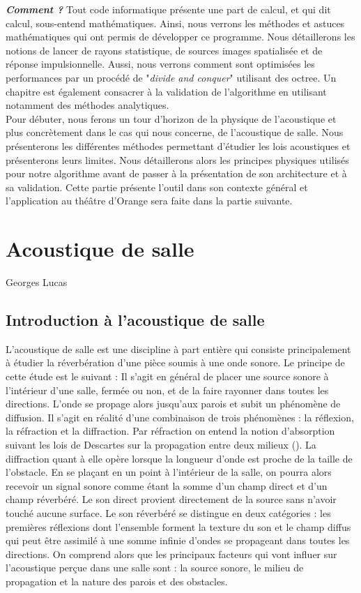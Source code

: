 \textit{\textbf{Comment ?}} Tout code informatique présente une part de calcul, et qui dit calcul, sous-entend mathématiques. Ainsi, nous verrons les méthodes et astuces mathématiques qui ont permis de développer ce programme. Nous détaillerons les notions de lancer de rayons statistique, de sources images spatialisée et de réponse impulsionnelle. Aussi, nous verrons comment sont optimisées les performances par un procédé de "\textit{divide and conquer}" utilisant des octree. Un chapitre est également consacrer à la validation de l'algorithme en utilisant notamment des méthodes analytiques.\\

Pour débuter, nous ferons un tour d'horizon de la physique de l'acoustique et plus concrètement dans le cas qui nous concerne, de l'acoustique de salle. Nous présenterons les différentes méthodes permettant d'étudier les lois acoustiques et présenterons leurs limites. Nous détaillerons alors les principes physiques utilisés pour notre algorithme avant de passer à la présentation de son architecture et à sa validation. Cette partie présente l'outil dans son contexte général et l'application au théâtre d'Orange sera faite dans la partie suivante.


\chapter{Acoustique de salle}
			{Georges Lucas}
		\minitoc
		\newpage
		
\section{Introduction à l'acoustique de salle}
L'acoustique de salle est une discipline à part entière qui consiste principalement à étudier la réverbération d'une pièce soumis à une onde sonore. Le principe de cette étude est le suivant : Il s'agit en général de placer une source sonore à l'intérieur d'une salle, fermée ou non, et de la faire rayonner dans toutes les directions. L'onde se propage alors jusqu'aux parois et subit un phénomène de diffusion. Il s'agit en réalité d'une combinaison de trois phénomènes : la réflexion, la réfraction et la diffraction. Par réfraction on entend la notion d'absorption suivant les lois de Descartes sur la propagation entre deux milieux (\cite{jouhaneau}). La diffraction quant à elle opère lorsque la longueur d'onde est proche de la taille de l'obstacle. En se plaçant en un point à l'intérieur de la salle, on pourra alors recevoir un signal sonore comme étant la somme d'un champ direct et d’un champ réverbéré. Le son direct provient directement de la source sans n'avoir touché aucune surface. Le son réverbéré se distingue en deux catégories : les premières réflexions dont l'ensemble forment la texture du son et le champ diffus qui peut être assimilé à une somme infinie d'ondes se propageant dans toutes les directions. 
On comprend alors que les principaux facteurs qui vont influer sur l'acoustique perçue dans une salle sont : la source sonore, le milieu de propagation et la nature des parois et des obstacles.

